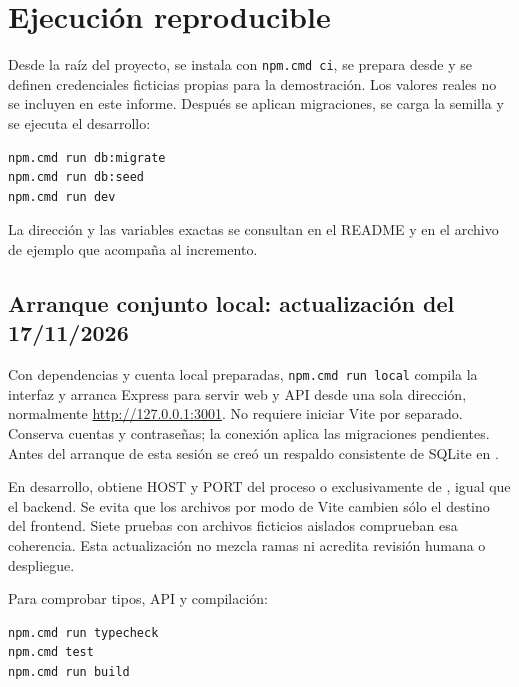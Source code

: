 
\section{Ejecución reproducible}
Desde la raíz del proyecto, se instala con \texttt{npm.cmd ci}, se prepara  desde  y se definen credenciales ficticias propias para la demostración. Los valores reales no se incluyen en este informe. Después se aplican migraciones, se carga la semilla y se ejecuta el desarrollo:

\begin{lstlisting}[language={},numbers=none]
npm.cmd run db:migrate
npm.cmd run db:seed
npm.cmd run dev
\end{lstlisting}

La dirección y las variables exactas se consultan en el README y en el archivo de ejemplo que acompaña al incremento.

\subsection{Arranque conjunto local: actualización del 17/11/2026}
Con dependencias y cuenta local preparadas, \texttt{npm.cmd run local} compila la interfaz y arranca Express para servir web y API desde una sola dirección, normalmente \url{http://127.0.0.1:3001}. No requiere iniciar Vite por separado. Conserva cuentas y contraseñas; la conexión aplica las migraciones pendientes. Antes del arranque de esta sesión se creó un respaldo consistente de SQLite en .

En desarrollo,  obtiene HOST y PORT del proceso o exclusivamente de , igual que el backend. Se evita que los archivos por modo de Vite cambien sólo el destino del frontend. Siete pruebas con archivos ficticios aislados comprueban esa coherencia. Esta actualización no mezcla ramas ni acredita revisión humana o despliegue.

Para comprobar tipos, API y compilación:

\begin{lstlisting}[language={},numbers=none]
npm.cmd run typecheck
npm.cmd test
npm.cmd run build
\end{lstlisting}

